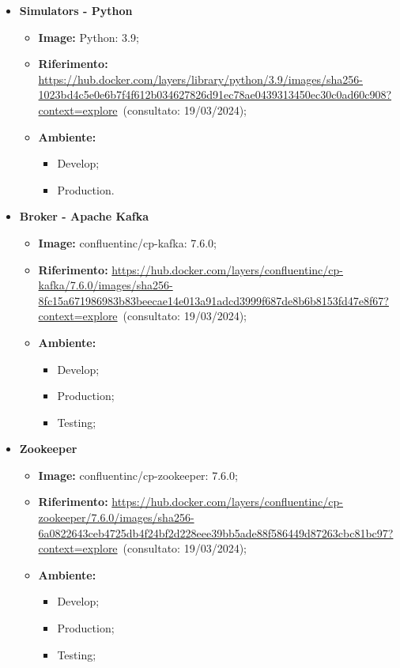 \begin{itemize}

  \item \textbf{Simulators - Python} 
    \begin{itemize}
      \item \textbf{Image:} Python: 3.9;
      \item \textbf{Riferimento:} \url{https://hub.docker.com/layers/library/python/3.9/images/sha256-1023bd4c5e0e6b7f4f612b034627826d91ec78ae0439313450ec30c0ad60c908?context=explore}~(consultato: 19/03/2024);
      \item \textbf{Ambiente:}
        \begin{itemize}
          \item Develop;
          \item Production.
        \end{itemize}
    \end{itemize}

  \item \textbf{Broker - Apache Kafka} 
    \begin{itemize}
      \item \textbf{Image:} confluentinc/cp-kafka: 7.6.0;
      \item \textbf{Riferimento:} \url{https://hub.docker.com/layers/confluentinc/cp-kafka/7.6.0/images/sha256-8fc15a671986983b83beecae14e013a91adcd3999f687de8b6b8153fd47e8f67?context=explore}~(consultato: 19/03/2024);
      \item \textbf{Ambiente:}
        \begin{itemize}
          \item Develop;
          \item Production;
          \item Testing;
        \end{itemize}
    \end{itemize}

  \item \textbf{Zookeeper} 
    \begin{itemize}
      \item \textbf{Image:} confluentinc/cp-zookeeper: 7.6.0;
      \item \textbf{Riferimento:} \url{https://hub.docker.com/layers/confluentinc/cp-zookeeper/7.6.0/images/sha256-6a0822643ceb4725db4f24bf2d228eee39bb5ade88f586449d87263cbc81bc97?context=explore}~(consultato: 19/03/2024);
      \item \textbf{Ambiente:}
        \begin{itemize}
          \item Develop;
          \item Production;
          \item Testing;
        \end{itemize}
    \end{itemize}


\end{itemize}
